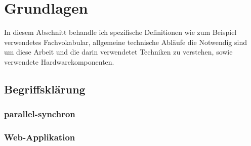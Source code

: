 \documentclass[13pt,a4paper,oneside]{scrbook} %
\newcommand{\tr}[1]{TOREMOVE-->\linebreak{#1} \linebreak <--TOREMOVE}
\renewcommand{\\}{\bigskip}
\begin{document}
\chapter{Grundlagen}
	In diesem Abschnitt behandle ich spezifische Definitionen wie zum Beispiel verwendetes Fachvokabular, allgemeine technische Abläufe die Notwendig sind um diese Arbeit und die darin verwendetet Techniken zu verstehen, sowie verwendete Hardwarekomponenten.
	\section{Begriffsklärung}	
		\subsection{parallel-synchron}
		\subsection{Web-Applikation}
\end{document}
